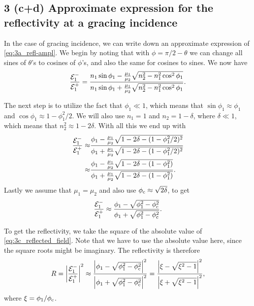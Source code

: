 \documentclass[11pt,letter, swedish, english
]{article}
\begin{document}
\subsection*{3 (c+d)\;
Approximate expression for the reflectivity 
at a gracing incidence}
In the case of gracing incidence, we can write down an approximate
expression of \eqref{eq:3a_refl-ampl}. We begin by noting that with
$\phi=\pi/2-\theta$ we can change all sines of $\theta$'s to cosines
of $\phi$'s, and also the same for cosines to sines. We now have
\begin{equation}
\frac{{\mathcal{E}_1^-}}{{\mathcal{E}_1^+}}=
\frac{n_1\sin\phi_1 - 
\frac{\mu_1}{\mu_2}\sqrt{n_2^2-n_1^2\cos^2\phi_1}}
{n_1\sin\phi_1 + \frac{\mu_1}{\mu_2}\sqrt{n_2^2-n_1^2\cos^2\phi_1}}.
\end{equation}

The next step is to utilize the fact that $\phi_1\ll1$, which means
that $\sin\phi_1 \approx \phi_1$ and 
$\cos\phi_1 \approx 1 - \phi_1^2/2$. 
We will also use $n_1=1$ and $n_2=1-\delta$, where $\delta\ll1$, which
means that $n_2^2 \approx 1 -2\delta$. With all this we end up with
\begin{equation}
\begin{aligned}
\frac{{\mathcal{E}_1^-}}{{\mathcal{E}_1^+}}\approx&
\frac{\phi_1 - \frac{\mu_1}{\mu_2}\sqrt{1-2\delta-(1-\phi_1^2/2)^2}}
{\phi_1 + \frac{\mu_1}{\mu_2}\sqrt{1-2\delta-(1-\phi_1^2/2)^2}}\\
\approx&
\frac{\phi_1 - \frac{\mu_1}{\mu_2}\sqrt{1-2\delta-(1-\phi_1^2)}}
{\phi_1 + \frac{\mu_1}{\mu_2}\sqrt{1-2\delta-(1-\phi_1^2)}}.
\end{aligned}
\end{equation}
Lastly we assume\footnotemark{} that $\mu_1=\mu_2$ and also use
$\phi_\text{c}\approx\sqrt{2\delta}$, to get
\begin{equation}\label{eq:3c_reflected_field}
\frac{{\mathcal{E}_1^-}}{{\mathcal{E}_1^+}} \approx
\frac{\phi_1 - \sqrt{\phi_1^2 - \phi_\text{c}^2}}
{\phi_1 + \sqrt{\phi_1^2 - \phi_\text{c}^2}}.
\end{equation}

To get the reflectivity, we take the square of the absolute value of
\eqref{eq:3c_reflected_field}. Note that we have to use the absolute
value here, since the square roots might be imaginary. The
reflectivity is therefore 
\begin{equation}
R = \abs{\frac{{\mathcal{E}_1^-}}{{\mathcal{E}_1^+}}}^2 \approx
\frac{\abs{\phi_1 - \sqrt{\phi_1^2 - \phi_\text{c}^2}}^2}
{\abs{\phi_1 + \sqrt{\phi_1^2 - \phi_\text{c}^2}}^2}
=\frac{\abs{\xi - \sqrt{\xi^2 - 1}}^2}
{\abs{\xi + \sqrt{\xi^2 - 1}}^2},
\end{equation}
where $\xi=\phi_1/\phi_\text{c}$.
\end{document}
